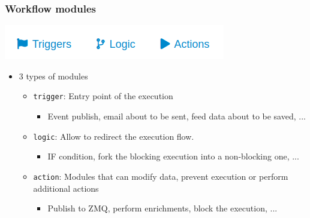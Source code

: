 \begin{frame}
    \frametitle{Workflow modules}
    \begin{center}
        \includegraphics[width=0.5\linewidth]{pictures/module-type.png}
    \end{center}
    \begin{itemize}
        \item 3 types of modules
        \begin{itemize}
            \item \texttt{trigger}: Entry point of the execution
            \begin{itemize}
                \item Event publish, email about to be sent, feed data about to be saved, ...
            \end{itemize}
            \item \texttt{logic}: Allow to redirect the execution flow.
            \begin{itemize}
                \item IF condition, fork the blocking execution into a non-blocking one, ...
            \end{itemize}
            \item \texttt{action}: Modules that can modify data, prevent execution or perform additional actions
            \begin{itemize}
                \item Publish to ZMQ, perform enrichments, block the execution, ...
            \end{itemize}
        \end{itemize}
    \end{itemize}
\end{frame}


